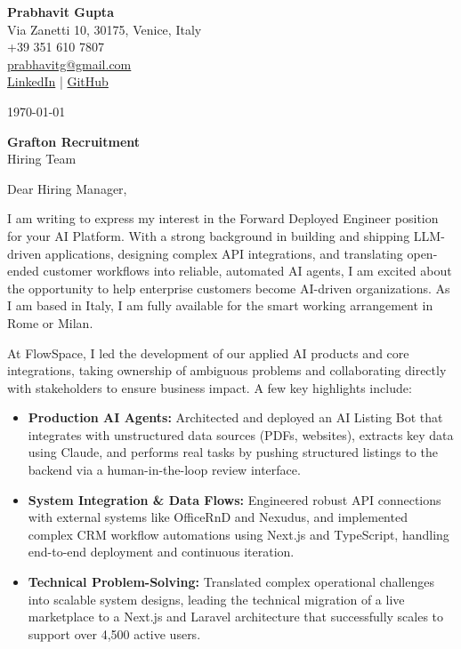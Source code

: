 \documentclass[11pt,a4paper]{article}
\begin{document}
\begin{flushright}
\textbf{Prabhavit Gupta}\\
Via Zanetti 10, 30175, Venice, Italy\\
+39 351 610 7807\\
\href{mailto:prabhavitg@gmail.com}{prabhavitg@gmail.com}\\
\href{https://www.linkedin.com/in/prabhavit/}{LinkedIn} | \href{https://github.com/prab-gupta}{GitHub}
\end{flushright}

\vspace{2em}

\today

\vspace{1em}

\textbf{Grafton Recruitment}\\
Hiring Team

\vspace{1.5em}

Dear Hiring Manager,

I am writing to express my interest in the Forward Deployed Engineer position for your AI Platform. With a strong background in building and shipping LLM-driven applications, designing complex API integrations, and translating open-ended customer workflows into reliable, automated AI agents, I am excited about the opportunity to help enterprise customers become AI-driven organizations. As I am based in Italy, I am fully available for the smart working arrangement in Rome or Milan.

At FlowSpace, I led the development of our applied AI products and core integrations, taking ownership of ambiguous problems and collaborating directly with stakeholders to ensure business impact. A few key highlights include:

{\raggedright\fontsize{11pt}{13pt}\selectfont \begin{itemize}
    \item \textbf{Production AI Agents:} Architected and deployed an AI Listing Bot that integrates with unstructured data sources (PDFs, websites), extracts key data using Claude, and performs real tasks by pushing structured listings to the backend via a human-in-the-loop review interface.
    \item \textbf{System Integration \& Data Flows:} Engineered robust API connections with external systems like OfficeRnD and Nexudus, and implemented complex CRM workflow automations using Next.js and TypeScript, handling end-to-end deployment and continuous iteration.
    \item \textbf{Technical Problem-Solving:} Translated complex operational challenges into scalable system designs, leading the technical migration of a live marketplace to a Next.js and Laravel architecture that successfully scales to support over 4,500 active users.
\end{itemize}\par}
\end{document}
